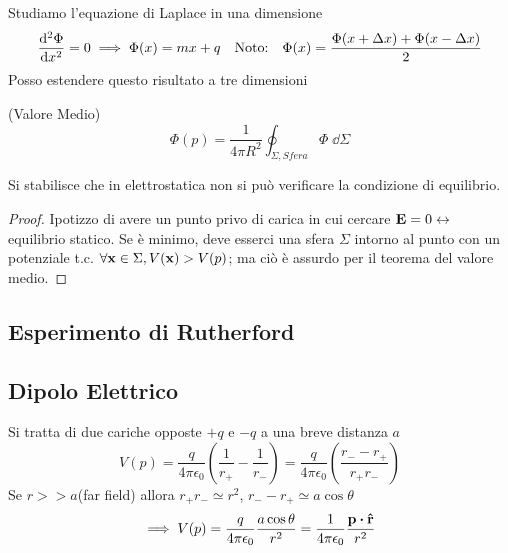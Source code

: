 \documentclass[12pt,a4paper]{article}
\begin{document}



Studiamo l'equazione di Laplace in una dimensione
\begin{equation*}
    \dv[2]{\Phi}{x}=0 \implies\Phi(x) = mx + q \quad \text{Noto:} \quad\Phi(x) = \frac{\Phi(x+\Delta x)+\Phi(x-\Delta x)}{2}
\end{equation*}
Posso estendere questo risultato a tre dimensioni
\begin{theorem}
    (Valore Medio)
    \begin{equation*}
        \Phi(p)= \frac{1}{4\pi R^2}\oint_{\Sigma, Sfera} \Phi \;\dd{\Sigma}
    \end{equation*}
\end{theorem}

\begin{proposition}
    Si stabilisce che in elettrostatica non si può verificare la condizione di equilibrio.
\end{proposition}
\begin{proof}
    Ipotizzo di avere un punto privo di carica in cui cercare $\vb{E}=0 \leftrightarrow$ equilibrio statico.
    Se è minimo, deve esserci una sfera $\Sigma$ intorno al punto con un potenziale t.c. $\forall\vb{x}\in\Sigma, V(\vb{x})>V(p)$;
    ma ciò è assurdo per il teorema del valore medio.
\end{proof}

\subsection{Esperimento di Rutherford}

\subsection{Dipolo Elettrico}
Si tratta di due cariche opposte $+ q$ e $-q$ a una breve distanza $a$
\begin{equation*}
    V(p)= \frac{q}{4\pi\epsilon_0}\left( \frac{1}{r_+}-\frac{1}{r_-} \right)= \frac{q}{4\pi\epsilon_0}\left( \frac{r_--r_+}{r_+r_-}\right)
\end{equation*}
Se $r>>a$(far field) allora $r_+r_-\simeq r^2$, $r_--r_+\simeq a \cos \theta$
\begin{equation*}
    \implies V(p)=  \frac{q}{4\pi\epsilon_0}\frac{a \cos \theta}{r^2}= \frac{1}{4\pi\epsilon_0}\frac{\vb{p}\vdot\vu{r}}{r^2}
\end{equation*}
\end{document}
